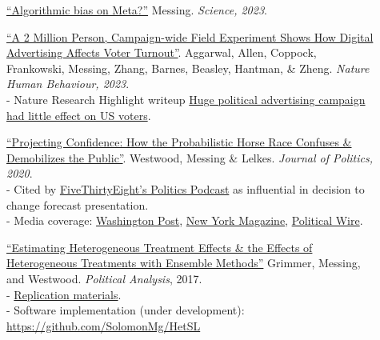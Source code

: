 \documentclass[letterpaper,11pt]{article}
\begin{document}
\begin{description}
\item[] \href{https://solomonmg.github.io/pdf/science.adk1211.pdf}{``Algorithmic bias on Meta?''} Messing.
\emph{Science, 2023}. \\ 



\item[] \href{https://www.nature.com/articles/s41562-022-01487-4}{``A 2 Million Person, Campaign-wide Field Experiment Shows How Digital Advertising Affects Voter Turnout''}. Aggarwal, Allen, Coppock, Frankowski, Messing, Zhang, Barnes, Beasley, Hantman, \& Zheng.
\emph{Nature Human Behaviour, 2023}. \\ 
- Nature Research Highlight writeup \href{https://www.nature.com/articles/d41586-023-00073-6}{Huge political advertising campaign had little effect on US voters}.\\


\item[] \href{https://www.journals.uchicago.edu/doi/abs/10.1086/708682}{``Projecting Confidence: How the Probabilistic Horse Race Confuses \& Demobilizes the Public''}. Westwood, Messing \& Lelkes. 
\emph{Journal of Politics, 2020}. \\ 
- Cited by \href{https://fivethirtyeight.com/features/politics-podcast-whats-so-wrong-with-nancy-pelosi/}{FiveThirtyEight's Politics Podcast} as influential in decision to change forecast presentation.\\
- Media coverage: \href{https://www.washingtonpost.com/news/politics/wp/2018/02/06/clintons-achilles-heel-in-2016-may-have-been-overconfidence/?utm_term=.b71fb84da00f}{Washington Post},  \href{http://nymag.com/daily/intelligencer/2018/02/americans-dont-understand-election-probabilities.html}{New York Magazine}, \href{https://politicalwire.com/2018/02/06/election-forecasts-lower-voter-turnout/}{Political Wire}.


\item[] \href{https://pages.shanti.virginia.edu/PolMeth/files/2013/07/GrimmerMessingWestwood.pdf}{``Estimating Heterogeneous Treatment Effects \& the Effects of Heterogeneous Treatments with Ensemble Methods''} Grimmer, Messing, and Westwood.
\emph{Political Analysis}, 2017. \\
- \href{http://dx.doi.org/10.7910/DVN/BQMLQW}{Replication materials}. \\
- Software implementation (under development): \url{https://github.com/SolomonMg/HetSL}



\end{description}
\end{document}
